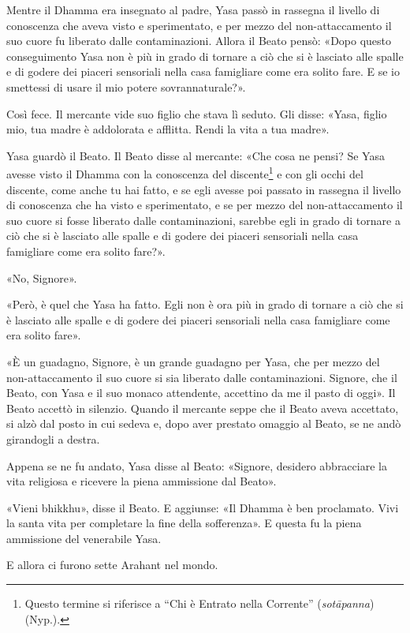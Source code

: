 Mentre il Dhamma era insegnato al padre, Yasa passò in rassegna il
livello di conoscenza che aveva visto e sperimentato, e per mezzo del
non-attaccamento il suo cuore fu liberato dalle contaminazioni. Allora
il Beato pensò: «Dopo questo conseguimento Yasa non è più in grado di
tornare a ciò che si è lasciato alle spalle e di godere dei piaceri
sensoriali nella casa famigliare come era solito fare. E se io smettessi
di usare il mio potere sovrannaturale?».


Così fece. Il mercante vide suo figlio che stava lì seduto. Gli disse:
«Yasa, figlio mio, tua madre è addolorata e afflitta. Rendi la vita a
tua madre».


Yasa guardò il Beato. Il Beato disse al mercante: «Che cosa ne pensi? Se
Yasa avesse visto il Dhamma con la conoscenza del
discente\footnote{Questo termine si riferisce a “Chi è Entrato nella Corrente” (\emph{sotāpanna}) (Nyp.).} e con gli occhi del discente, come anche tu
hai fatto, e se egli avesse poi passato in rassegna il livello di
conoscenza che ha visto e sperimentato, e se per mezzo del
non-attaccamento il suo cuore si fosse liberato dalle contaminazioni,
sarebbe egli in grado di tornare a ciò che si è lasciato alle spalle e
di godere dei piaceri sensoriali nella casa famigliare come era solito
fare?».


«No, Signore».


«Però, è quel che Yasa ha fatto. Egli non è ora più in grado di tornare
a ciò che si è lasciato alle spalle e di godere dei piaceri sensoriali
nella casa famigliare come era solito fare».


«È un guadagno, Signore, è un grande guadagno per Yasa, che per mezzo
del non-attaccamento il suo cuore si sia liberato dalle contaminazioni.
Signore, che il Beato, con Yasa e il suo monaco attendente, accettino da
me il pasto di oggi». Il Beato accettò in silenzio. Quando il mercante
seppe che il Beato aveva accettato, si alzò dal posto in cui sedeva e,
dopo aver prestato omaggio al Beato, se ne andò girandogli a destra.


Appena se ne fu andato, Yasa disse al Beato: «Signore, desidero
abbracciare la vita religiosa e ricevere la piena ammissione dal Beato».


«Vieni bhikkhu», disse il Beato. E aggiunse: «Il Dhamma è ben
proclamato. Vivi la santa vita per completare la fine della sofferenza».
E questa fu la piena ammissione del venerabile Yasa.


E allora ci furono sette Arahant nel mondo.


